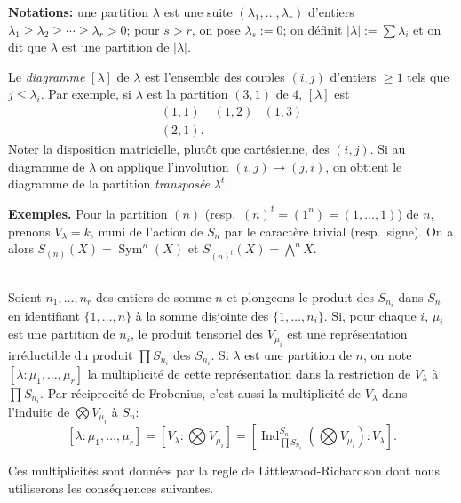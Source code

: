 \documentclass[11pt,a4paper]{article}
\theoremstyle{plain}
\theoremstyle{definition}
\DeclareMathOperator{\Sym}{Sym}
\DeclareMathOperator{\Ind}{Ind}
\begin{document}
\medskip\noindent\textbf{Notations:} une partition $\lambda$ est une suite $(\lambda_1,\ldots,\lambda_r)$ d'entiers $\lambda_1\geq\lambda_2\geq\cdots\geq\lambda_r>0$; pour $s>r$, on pose $\lambda_s:=0$; on d\'efinit $|\lambda|:=\sum\lambda_i$ et on dit que $\lambda$ est une partition de $|\lambda|$.

Le \emph{diagramme} $[\lambda]$ de $\lambda$ est l'ensemble des couples $(i,j)$ d'entiers $\geq1$ tels que $j\leq\lambda_i$. Par exemple, si $\lambda$ est la partition $(3,1)$ de $4$, $[\lambda]$ est
\[
\begin{matrix}
(1,1) & (1,2) & (1,3)\\
(2,1).
\end{matrix}
\]
Noter la disposition matricielle, plut\^ot que cart\'esienne, des $(i,j)$. Si au diagramme de $\lambda$ on applique l'involution $(i,j)\mapsto(j,i)$, on obtient le diagramme de la partition \emph{transpos\'ee} $\lambda^t$.

\medskip\noindent\textbf{Exemples.} Pour la partition $(n)$ (resp.~$(n)^t=(1^n)=(1,\ldots,1)$) de $n$, prenons $V_\lambda=k$, muni de l'action de $S_n$ par le caract\`ere trivial (resp.~signe). On a alors $S_{(n)}(X)=\Sym^n(X)$ et $S_{(n)^t}(X)=\bigwedge^nX$.

\subsection{}\label{1.5}

Soient $n_1,\ldots,n_r$ des entiers de somme $n$ et plongeons le produit des $S_{n_i}$ dans $S_n$ en identifiant $\{1,\ldots,n\}$ \`a la somme disjointe des $\{1,\ldots,n_i\}$. Si, pour chaque $i$, $\mu_i$ est une partition de $n_i$, le produit tensoriel des $V_{\mu_i}$ est une repr\'esentation irr\'eductible du produit $\prod S_{n_i}$ des $S_{n_i}$. Si $\lambda$ est une partition de $n$, on note $[\lambda:\mu_1,\ldots,\mu_r]$ la multiplicit\'e de cette repr\'esentation dans la restriction de $V_\lambda$ \`a $\prod S_{n_i}$. Par r\'eciprocit\'e de Frobenius, c'est aussi la multiplicit\'e de $V_\lambda$ dans l'induite de $\bigotimes V_{\mu_i}$ \`a $S_n$:
\[
[\lambda:\mu_1,\ldots,\mu_r]=[V_\lambda:\bigotimes V_{\mu_i}]=[\Ind^{S_n}_{\prod S_{n_i}}(\bigotimes V_{\mu_i}):V_\lambda].
\]

Ces multiplicit\'es sont donn\'ees par la regle de Littlewood-Richardson dont nous utiliserons les cons\'equences suivantes.
\end{document}
